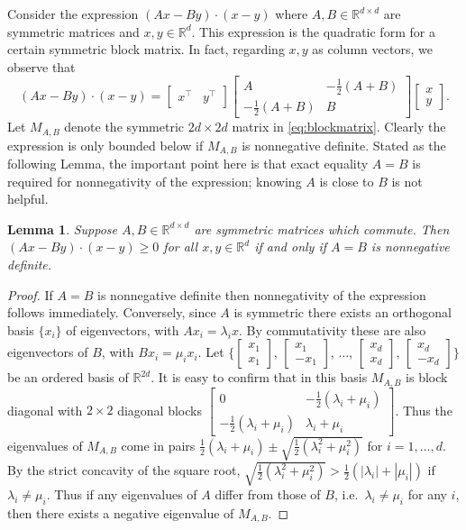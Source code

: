 \documentclass[letterpaper,final,12pt,reqno]{amsart}
\theoremstyle{cstyle}
\newtheorem{lemma}[theorem]{Lemma}
\theoremstyle{cstyle*}
\theoremstyle{dstyle}
\numberwithin{equation}{section}
\numberwithin{figure}{section}
\numberwithin{table}{section}
\numberwithin{theorem}{section}
\newcommand{\RR}{\mathbb{R}}
\begin{document}
Consider the expression $(Ax - By)\cdot (x-y)$ where $A,B \in \RR^{d\times d}$ are symmetric matrices and $x,y\in \RR^d$.  This expression is the quadratic form for a certain symmetric block matrix.  In fact, regarding $x,y$ as column vectors, we observe that
\begin{equation}
(Ax - By)\cdot (x-y) = \begin{bmatrix} x^\top & y^\top \end{bmatrix} \begin{bmatrix}
                        A & -\frac{1}{2}(A+B) \\
                        -\frac{1}{2}(A+B) & B \end{bmatrix} \begin{bmatrix} x \\ y \end{bmatrix}. \label{eq:blockmatrix}
\end{equation}
Let $M_{A,B}$ denote the symmetric $2d \times 2d$ matrix in \eqref{eq:blockmatrix}.  Clearly the expression is only bounded below if $M_{A,B}$ is nonnegative definite.  Stated as the following Lemma, the important point here is that exact equality $A=B$ is required for nonnegativity of the expression; knowing $A$ is close to $B$ is not helpful.

\begin{lemma}  Suppose $A,B \in \RR^{d\times d}$ are symmetric matrices which commute.  Then $(Ax - By)\cdot (x-y)\ge 0$ for all $x,y\in \RR^d$ if and only if $A=B$ is nonnegative definite. \end{lemma}

\newcommand{\sbvec}[2]{\left[\begin{smallmatrix} #1 \\ #2 \end{smallmatrix}\right]}
\newcommand{\sbmat}[4]{\left[\begin{smallmatrix} #1 & #2 \\ #3 & #4 \end{smallmatrix}\right]}

\begin{proof}
If $A=B$ is nonnegative definite then nonnegativity of the expression follows immediately.  Conversely, since $A$ is symmetric there exists an orthogonal basis $\{x_i\}$ of eigenvectors, with $Ax_i = \lambda_i x$.  By commutativity these are also eigenvectors of $B$, with $Bx_i = \mu_i x_i$.  Let $\big\{\sbvec{x_1}{x_1}$, $\sbvec{x_1}{-x_1}$, $\dots$, $\sbvec{x_d}{x_d}$, $\sbvec{x_d}{-x_d}\big\}$ be an ordered basis of $\RR^{2d}$.  It is easy to confirm that in this basis $M_{A,B}$ is block diagonal with $2\times 2$ diagonal blocks $\sbmat{0}{-\frac{1}{2}(\lambda_i+\mu_i)}{-\frac{1}{2}(\lambda_i+\mu_i)}{\lambda_i+\mu_i}$.  Thus the eigenvalues of $M_{A,B}$ come in pairs $\frac{1}{2}(\lambda_i + \mu_i) \pm \sqrt{\frac{1}{2}(\lambda_i^2 + \mu_i^2)}$ for $i=1,\dots,d$.  By the strict concavity of the square root, $\sqrt{\frac{1}{2}(\lambda_i^2 + \mu_i^2)} > \frac{1}{2}(|\lambda_i| + |\mu_i|)$ if $\lambda_i\ne \mu_i$.  Thus if any eigenvalues of $A$ differ from those of $B$, i.e.~$\lambda_i\ne \mu_i$ for any $i$, then there exists a negative eigenvalue of $M_{A,B}$.
\end{proof}
\end{document}
